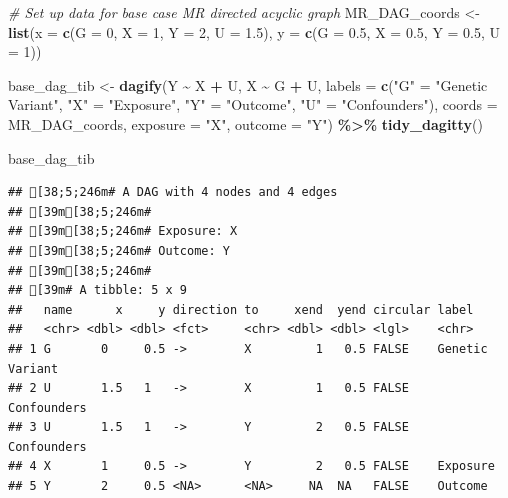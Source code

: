 \documentclass[
]{article}
\newenvironment{Shaded}{\begin{snugshade}}{\end{snugshade}}
\newcommand{\AttributeTok}[1]{\textcolor[rgb]{0.13,0.29,0.53}{#1}}
\newcommand{\CommentTok}[1]{\textcolor[rgb]{0.56,0.35,0.01}{\textit{#1}}}
\newcommand{\DecValTok}[1]{\textcolor[rgb]{0.00,0.00,0.81}{#1}}
\newcommand{\FloatTok}[1]{\textcolor[rgb]{0.00,0.00,0.81}{#1}}
\newcommand{\FunctionTok}[1]{\textcolor[rgb]{0.13,0.29,0.53}{\textbf{#1}}}
\newcommand{\NormalTok}[1]{#1}
\newcommand{\OtherTok}[1]{\textcolor[rgb]{0.56,0.35,0.01}{#1}}
\newcommand{\SpecialCharTok}[1]{\textcolor[rgb]{0.81,0.36,0.00}{\textbf{#1}}}
\newcommand{\StringTok}[1]{\textcolor[rgb]{0.31,0.60,0.02}{#1}}
\begin{document}
\begin{Shaded}
\begin{Highlighting}[]
\CommentTok{\# Set up data for base case MR directed acyclic graph}
\NormalTok{MR\_DAG\_coords }\OtherTok{\textless{}{-}} \FunctionTok{list}\NormalTok{(}\AttributeTok{x =} \FunctionTok{c}\NormalTok{(}\AttributeTok{G =} \DecValTok{0}\NormalTok{, }\AttributeTok{X =} \DecValTok{1}\NormalTok{, }\AttributeTok{Y =} \DecValTok{2}\NormalTok{, }\AttributeTok{U =} \FloatTok{1.5}\NormalTok{),}
                      \AttributeTok{y =} \FunctionTok{c}\NormalTok{(}\AttributeTok{G =} \FloatTok{0.5}\NormalTok{, }\AttributeTok{X =} \FloatTok{0.5}\NormalTok{, }\AttributeTok{Y =} \FloatTok{0.5}\NormalTok{, }\AttributeTok{U =} \DecValTok{1}\NormalTok{))}


\NormalTok{base\_dag\_tib }\OtherTok{\textless{}{-}} \FunctionTok{dagify}\NormalTok{(Y }\SpecialCharTok{\textasciitilde{}}\NormalTok{ X }\SpecialCharTok{+}\NormalTok{ U,}
\NormalTok{                       X }\SpecialCharTok{\textasciitilde{}}\NormalTok{ G }\SpecialCharTok{+}\NormalTok{ U,}
                       \AttributeTok{labels =} \FunctionTok{c}\NormalTok{(}\StringTok{"G"} \OtherTok{=} \StringTok{"Genetic Variant"}\NormalTok{,}
                                  \StringTok{"X"} \OtherTok{=} \StringTok{"Exposure"}\NormalTok{,}
                                  \StringTok{"Y"} \OtherTok{=} \StringTok{"Outcome"}\NormalTok{,}
                                  \StringTok{"U"} \OtherTok{=} \StringTok{"Confounders"}\NormalTok{),}
                       \AttributeTok{coords =}\NormalTok{ MR\_DAG\_coords,}
                       \AttributeTok{exposure =} \StringTok{"X"}\NormalTok{,}
                       \AttributeTok{outcome =} \StringTok{"Y"}\NormalTok{) }\SpecialCharTok{\%\textgreater{}\%} 
  \FunctionTok{tidy\_dagitty}\NormalTok{() }

\NormalTok{base\_dag\_tib}
\end{Highlighting}
\end{Shaded}

\begin{verbatim}
## [38;5;246m# A DAG with 4 nodes and 4 edges
## [39m[38;5;246m#
## [39m[38;5;246m# Exposure: X
## [39m[38;5;246m# Outcome: Y
## [39m[38;5;246m#
## [39m# A tibble: 5 x 9
##   name      x     y direction to     xend  yend circular label          
##   <chr> <dbl> <dbl> <fct>     <chr> <dbl> <dbl> <lgl>    <chr>          
## 1 G       0     0.5 ->        X         1   0.5 FALSE    Genetic Variant
## 2 U       1.5   1   ->        X         1   0.5 FALSE    Confounders    
## 3 U       1.5   1   ->        Y         2   0.5 FALSE    Confounders    
## 4 X       1     0.5 ->        Y         2   0.5 FALSE    Exposure       
## 5 Y       2     0.5 <NA>      <NA>     NA  NA   FALSE    Outcome
\end{verbatim}
\end{document}
